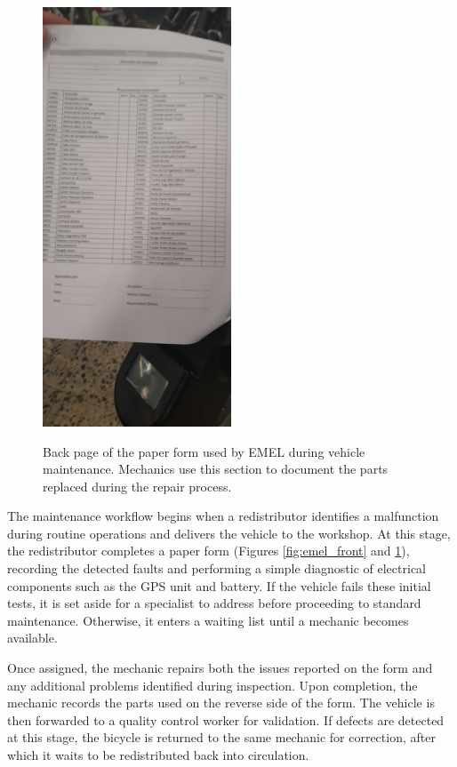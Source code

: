 \begin{figure}[h]
  \caption{Back page of the paper form used by EMEL during vehicle maintenance. Mechanics use this section to document the parts replaced during the repair process.}
  \centering
  \includegraphics[width=0.50\textwidth]{figs/chapter2/emel_back}
  \label{fig:emel_back}
\end{figure}

The maintenance workflow begins when a redistributor identifies a malfunction during routine operations and delivers the vehicle to the workshop. At this stage, the redistributor completes a paper form (Figures \ref{fig:emel_front} and \ref{fig:emel_back}), recording the detected faults and performing a simple diagnostic of electrical components such as the GPS unit and battery. If the vehicle fails these initial tests, it is set aside for a specialist to address before proceeding to standard maintenance. Otherwise, it enters a waiting list until a mechanic becomes available.

Once assigned, the mechanic repairs both the issues reported on the form and any additional problems identified during inspection. Upon completion, the mechanic records the parts used on the reverse side of the form. The vehicle is then forwarded to a quality control worker for validation. If defects are detected at this stage, the bicycle is returned to the same mechanic for correction, after which it waits to be redistributed back into circulation.

